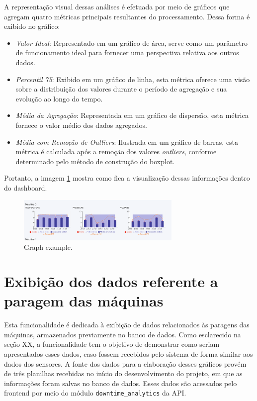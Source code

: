 A representação visual dessas análises é efetuada por meio de gráficos que agregam quatro métricas principais resultantes do processamento. Dessa forma é exibido no gráfico:

\begin{itemize}
    \item \textit{Valor Ideal}: Representado em um gráfico de área, serve como um parâmetro de funcionamento ideal para fornecer uma perspectiva relativa aos outros dados.
    \item \textit{Percentil 75}: Exibido em um gráfico de linha, esta métrica oferece uma visão sobre a distribuição dos valores durante o período de agregação e sua evolução ao longo do tempo.
    \item \textit{Média da Agregação}: Representada em um gráfico de dispersão, esta métrica fornece o valor médio dos dados agregados.
    \item \textit{Média com Remoção de \textit{Outliers}}: Ilustrada em um gráfico de barras, esta métrica é calculada após a remoção dos valores \textit{outliers}, conforme determinado pelo método de construção do boxplot.
\end{itemize}

Portanto, a imagem \ref{fig:graphData} mostra como fica a visualização dessas informações dentro do dashboard.

\begin{figure}[htbp]
	\centering
	\includegraphics[width=0.7\textwidth]{images/graphData.png}
	\caption{Graph example.}
	\label{fig:graphData}
\end{figure}

\section[Exibição dos dados referente a paragem das máquinas]{Exibição dos dados referente a paragem das máquinas}\label{sec:downtime}

Esta funcionalidade é dedicada à exibição de dados relacionados às paragens das máquinas, armazenados previamente no banco de dados. Como esclarecido na seção XX, a funcionalidade tem o objetivo de demonstrar como seriam apresentados esses dados, caso fossem recebidos pelo sistema de forma similar aos dados dos sensores. A fonte dos dados para a elaboração desses gráficos provém de três planilhas recebidas no início do desenvolvimento do projeto, em que as informações foram salvas no banco de dados. Esses dados são acessados pelo frontend por meio do módulo \texttt{downtime\_analytics} da \gls{API}.

